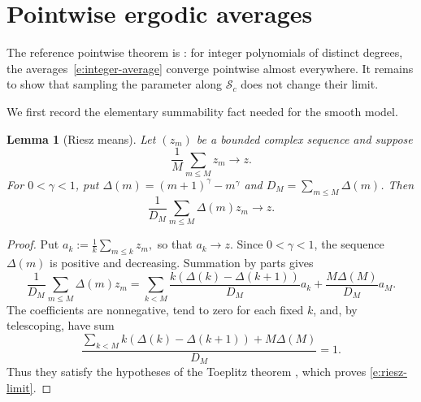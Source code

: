 \documentclass{amsart}
\newcommand{\1}{\mathbf 1}
\newcommand{\calS}{\mathcal S}
\newtheorem{lemma}[theorem]{Lemma}
\begin{document}
\section{Pointwise ergodic averages}

The reference pointwise theorem  is
\cite[Theorem~1.3]{KMPWW}: for integer polynomials of distinct degrees,
the averages~\eqref{e:integer-average} converge pointwise almost
everywhere.  It remains to show that sampling the parameter along
$\calS_c$ does not change their limit.

We first record the elementary summability fact needed for the smooth
model.

\begin{lemma}[Riesz means]\label{l:riesz}
Let $(z_m)$ be a bounded complex sequence and suppose
\[
 \frac1M\sum_{m\leq M}z_m\longrightarrow z.
\]
For $0<\gamma<1$, put
$\Delta(m)=(m+1)^\gamma-m^\gamma$ and
$D_M=\sum_{m\leq M}\Delta(m)$.  Then
\begin{equation}\label{e:riesz-limit}
 \frac1{D_M}\sum_{m\leq M}\Delta(m)z_m\longrightarrow z.
\end{equation}
\end{lemma}



\begin{proof}
Put $ a_k:=\frac1k\sum_{m\leq k}z_m,$
so that \(a_k\to z\).  Since \(0<\gamma<1\), the sequence
\(\Delta(m)\) is positive and decreasing.  Summation by parts gives
\[
 \frac1{D_M}\sum_{m\leq M}\Delta(m)z_m
 =
 \sum_{k<M}\frac{k(\Delta(k)-\Delta(k+1))}{D_M}a_k
 +\frac{M\Delta(M)}{D_M}a_M.
\]
The coefficients are nonnegative, tend to zero for each fixed \(k\),
and, by telescoping, have sum
\[
 \frac{\sum_{k<M}k(\Delta(k)-\Delta(k+1))+M\Delta(M)}
 {D_M}=1.
\]
Thus they satisfy the hypotheses of the Toeplitz theorem
\cite[Theorem~2.6]{DaskalakisPointwise}, which proves
\eqref{e:riesz-limit}.
\end{proof}
\end{document}
